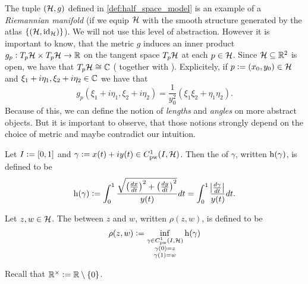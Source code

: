 \begin{remark}
	The tuple $(\mathcal{H},g)$ defined in \ref{def:half_space_model} is an example of a \emph{Riemannian manifold} (if we equip $\mathcal{H}$ with the smooth structure generated by the atlas $\cbr[0]{(\Hcal,\id_\Hcal)}$). We will not use this level of abstraction. However it is important to know, that the metric $g$ induces an inner product $g_p: T_p\mathcal{H} \times T_p\mathcal{H} \to \mathbb{R}$ on the tangent space $T_p\mathcal{H}$ at each $p \in \mathcal{H}$. Since $\mathcal{H} \subseteq \mathbb{R}^2$ is open, we have that $T_p\mathcal{H} \cong \mathbb{C}$ (\cite[56]{lee:smooth_manifolds:2013} together with \cite[53]{lee:smooth_manifolds:2013}). Explicitely, if $p := (x_0,y_0) \in \mathcal{H}$ and $\xi_1 + i\eta_1,\xi_2 + i\eta_2 \in \mathbb{C}$ we have that
	\begin{equation}
		g_p(\xi_1 + i\eta_1, \xi_2 + i\eta_2) = \frac{1}{y_0^2}(\xi_1\xi_2 + \eta_1\eta_2).
	\end{equation}
	Because of this, we can define the notion of \emph{lengths} and \emph{angles} on more abstract objects. But it is important to observe, that those notions strongly depend on the choice of metric and maybe contradict our intuition. 
\end{remark}

\begin{definition}
	Let $I := \intcc{0,1}$ and $\gamma := x(t) + iy(t) \in C^1_{\mathrm{pw}}(I,\mathcal{H})$. Then the  of $\gamma$, written $\operatorname{h}(\gamma)$, is defined to be
	\begin{equation}
		\h(\gamma) := \int_0^1 \frac{\sqrt{\del[1]{\frac{dx}{dt}}^2 + \del[1]{\frac{dy}{dt}}^2}}{y(t)} dt = \int_0^1 \frac{\abs[1]{\frac{d\gamma}{dt}}}{y(t)}dt.
	\end{equation}
\end{definition}

\begin{definition}
	Let $z,w \in \mathcal{H}$. The  between $z$ and $w$, written $\rho(z,w)$, is defined to be
	\begin{equation}
		\rho(z,w) := \inf_{\substack{\gamma \in C^1_{\mathrm{pw}}(I,\mathcal{H})\\ \gamma(0) = z\\ \gamma(1) = w}} \operatorname{h}(\gamma)
	\end{equation}
\end{definition}

Recall that $\Rbb^\times := \Rbb \setminus \cbr[0]{0}$.

